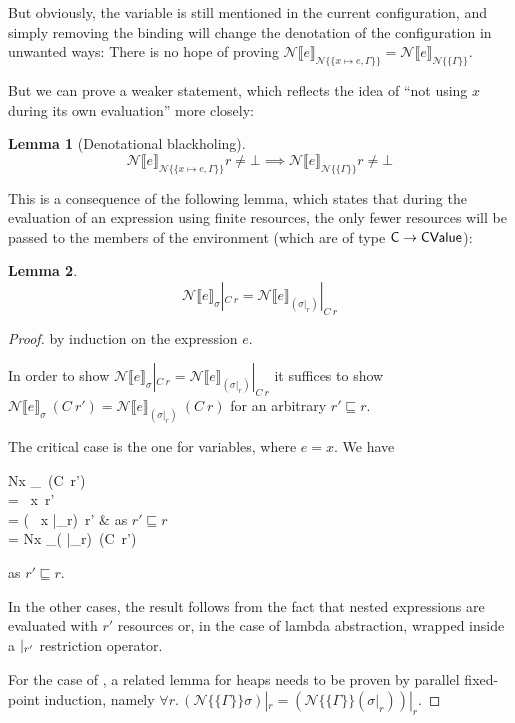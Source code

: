 \documentclass{jfp1}
\newtheorem{lemma}{Lemma}
\theoremstyle{nonumberbreak}
\newtheorem{proof}{Proof}
\newcommand{\sCValue}{\text{\textsf{CValue}}}
\newcommand{\sC}     {\text{\textsf{C}}}
\newcommand{\keyword}[1]{\text{\textsf{#1}}}
\newcommand{\dsemr}[2]{\mathcal N\!\llbracket #1 \rrbracket_{#2}}
\newcommand{\esemr}[1]{\mathcal N\!\!\{\!\!\!\{#1\}\!\!\!\}}
\newcommand{\Crestr}[2]{ #1 |_{#2}}
\begin{document}
But obviously, the variable is still mentioned in the current configuration, and simply removing the binding will change the denotation of the configuration in unwanted ways: There is no hope of proving $\dsemr{e}{\esemr{x\mapsto e, \Gamma}} = \dsemr{e}{\esemr{\Gamma}}$.

But we can prove a weaker statement, which reflects the idea of ``not using $x$ during its own evaluation'' more closely:

\begin{lemma}[Denotational blackholing]
\label{lem_denblackhole}
\[
\dsemr{e}{\esemr{x\mapsto e, \Gamma}} r \ne \bot \implies \dsemr{e}{\esemr{\Gamma}} r \ne \bot
\]
\end{lemma}

This is a consequence of the following lemma, which states that during the evaluation of an expression using finite resources, the only fewer resources will be passed to the members of the environment (which are of type $\sC \to \sCValue$):

\begin{lemma}
\[
\label{lem_denrestr}
\Crestr{\dsemr{e}\sigma}{C~r} = \Crestr{\dsemr{e}{(\Crestr{\sigma}{r})}}{C~r}
\]
\end{lemma}
\begin{proof}
by induction on the expression $e$.


In order to show $\Crestr{\dsemr{e}\sigma}{C~r} = \Crestr{\dsemr{e}{(\Crestr{\sigma}{r})}}{C~r}$ it suffices to show $\dsemr{e}\sigma~(C~r') = \dsemr{e}{(\Crestr{\sigma}{r})}~(C~r)$ for an arbitrary $r'\sqsubseteq r$.

The critical case is the one for variables, where $e = x$. We have
\begin{conteq}[oneline]
\dsemr{x}\sigma~(C~r')
\\
= \sigma~x~r' \\
= (\Crestr{\sigma~x}{r})~r' & as $r'\sqsubseteq r$ \\
= \dsemr{x}{(\Crestr{\sigma}{r})}~(C~r')
\end{conteq}
as $r'\sqsubseteq r$.

In the other cases, the result follows from the fact that nested expressions are evaluated with $r'$ resources or, in the case of lambda abstraction, wrapped inside a $\Crestr \strut {r'}$ restriction operator.

For the case of \keyword{let}, a related lemma for heaps needs to be proven by parallel fixed-point induction, namely $\forall r.\, \Crestr{(\esemr{\Gamma}\sigma)}r = \Crestr{(\esemr{\Gamma}{(\Crestr\sigma r)})}r$.
\end{proof}
\end{document}
